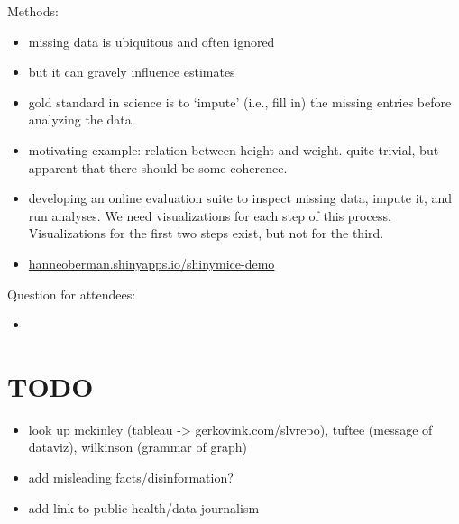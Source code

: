 \documentclass[
]{article}
\providecommand{\tightlist}{%
  \setlength{\itemsep}{0pt}\setlength{\parskip}{0pt}}
\begin{document}
Methods:

\begin{itemize}
\item
  missing data is ubiquitous and often ignored
\item
  but it can gravely influence estimates
\item
  gold standard in science is to `impute' (i.e., fill in) the missing
  entries before analyzing the data.
\item
  motivating example: relation between height and weight. quite trivial,
  but apparent that there should be some coherence.
\item
  developing an online evaluation suite to inspect missing data, impute
  it, and run analyses. We need visualizations for each step of this
  process. Visualizations for the first two steps exist, but not for the
  third.
\item
  \url{hanneoberman.shinyapps.io/shinymice-demo}
\end{itemize}

Question for attendees:

\begin{itemize}
\tightlist
\item
\end{itemize}

\hypertarget{todo}{%
\section{TODO}\label{todo}}

\begin{itemize}
\item
  look up mckinley (tableau -\textgreater{} gerkovink.com/slvrepo),
  tuftee (message of dataviz), wilkinson (grammar of graph)
\item
  add misleading facts/disinformation?
\item
  add link to public health/data journalism
\end{itemize}
\end{document}
